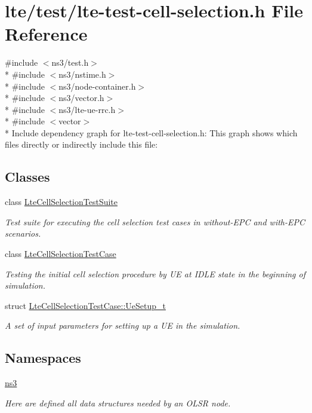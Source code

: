 \hypertarget{lte-test-cell-selection_8h}{}\section{lte/test/lte-\/test-\/cell-\/selection.h File Reference}
\label{lte-test-cell-selection_8h}
{\ttfamily \#include $<$ns3/test.\+h$>$}\\*
{\ttfamily \#include $<$ns3/nstime.\+h$>$}\\*
{\ttfamily \#include $<$ns3/node-\/container.\+h$>$}\\*
{\ttfamily \#include $<$ns3/vector.\+h$>$}\\*
{\ttfamily \#include $<$ns3/lte-\/ue-\/rrc.\+h$>$}\\*
{\ttfamily \#include $<$vector$>$}\\*
Include dependency graph for lte-\/test-\/cell-\/selection.h\+:
This graph shows which files directly or indirectly include this file\+:
\subsection*{Classes}
\begin{DoxyCompactItemize}
\item 
class \hyperlink{classLteCellSelectionTestSuite}{Lte\+Cell\+Selection\+Test\+Suite}
\begin{DoxyCompactList}\small\item\em Test suite for executing the cell selection test cases in without-\/\+E\+PC and with-\/\+E\+PC scenarios. \end{DoxyCompactList}\item 
class \hyperlink{classLteCellSelectionTestCase}{Lte\+Cell\+Selection\+Test\+Case}
\begin{DoxyCompactList}\small\item\em Testing the initial cell selection procedure by UE at I\+D\+LE state in the beginning of simulation. \end{DoxyCompactList}\item 
struct \hyperlink{structLteCellSelectionTestCase_1_1UeSetup__t}{Lte\+Cell\+Selection\+Test\+Case\+::\+Ue\+Setup\+\_\+t}
\begin{DoxyCompactList}\small\item\em A set of input parameters for setting up a UE in the simulation. \end{DoxyCompactList}\end{DoxyCompactItemize}
\subsection*{Namespaces}
\begin{DoxyCompactItemize}
\item 
 \hyperlink{namespacens3}{ns3}
\begin{DoxyCompactList}\small\item\em Here are defined all data structures needed by an O\+L\+SR node. \end{DoxyCompactList}\end{DoxyCompactItemize}
